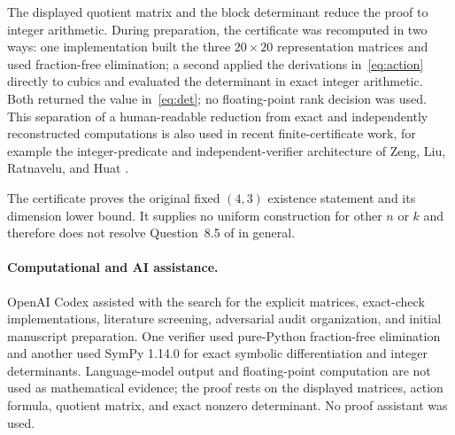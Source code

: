\documentclass[11pt]{article}
\begin{document}
The displayed quotient matrix and the block determinant reduce the proof to
integer arithmetic.  During preparation, the certificate was recomputed in
two ways: one implementation built the three $20\times20$ representation
matrices and used fraction-free elimination; a second applied the derivations
in~\eqref{eq:action} directly to cubics and evaluated the determinant in exact
integer arithmetic.  Both returned the value in~\eqref{eq:det}; no
floating-point rank decision was used.  This separation of a human-readable
reduction from exact and independently reconstructed computations is also
used in recent finite-certificate work, for example the integer-predicate and
independent-verifier architecture of Zeng, Liu, Ratnavelu, and Huat
\cite[Sections~4 and~6]{ZengEtAl2026Certificates}.

The certificate proves the original fixed $(4,3)$ existence statement and
its dimension lower bound.  It supplies no uniform construction for other
$n$ or $k$ and therefore does not resolve Question~8.5 of
\cite{JezernikSpenko2026} in general.

\paragraph{Computational and AI assistance.}
OpenAI Codex assisted with the search for the explicit matrices, exact-check
implementations, literature screening, adversarial audit organization, and
initial manuscript preparation.  One verifier used pure-Python
fraction-free elimination and another used SymPy 1.14.0 for exact symbolic
differentiation and integer determinants.  Language-model output and
floating-point computation are not used as mathematical evidence; the proof
rests on the displayed matrices, action formula, quotient matrix, and exact
nonzero determinant.  No proof assistant was used.



\end{document}

